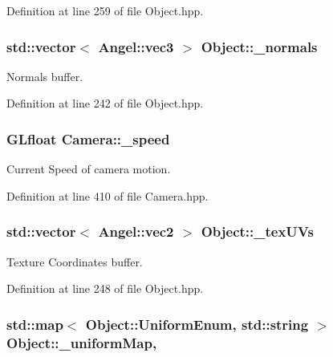 Definition at line 259 of file Object.\-hpp.

\hypertarget{class_object_a20bb786cb5915934853855aab9d1a1b3}{
\subsubsection[{\-\_\-normals}]{\setlength{\rightskip}{0pt plus 5cm}std\-::vector$<$ {\bf Angel\-::vec3} $>$ Object\-::\-\_\-normals\hspace{0.3cm}{\ttfamily [inherited]}}}\label{class_object_a20bb786cb5915934853855aab9d1a1b3}


Normals buffer. 



Definition at line 242 of file Object.\-hpp.

\hypertarget{class_camera_a21f8eb53e5369018e39add0453ae626d}{
\subsubsection[{\-\_\-speed}]{\setlength{\rightskip}{0pt plus 5cm}G\-Lfloat Camera\-::\-\_\-speed\hspace{0.3cm}{\ttfamily [private]}}}\label{class_camera_a21f8eb53e5369018e39add0453ae626d}


Current Speed of camera motion. 



Definition at line 410 of file Camera.\-hpp.

\hypertarget{class_object_aa9ddc3b95d74b76ab8a251fb376dfafb}{
\subsubsection[{\-\_\-tex\-U\-Vs}]{\setlength{\rightskip}{0pt plus 5cm}std\-::vector$<$ {\bf Angel\-::vec2} $>$ Object\-::\-\_\-tex\-U\-Vs\hspace{0.3cm}{\ttfamily [inherited]}}}\label{class_object_aa9ddc3b95d74b76ab8a251fb376dfafb}


Texture Coordinates buffer. 



Definition at line 248 of file Object.\-hpp.

\hypertarget{class_object_a6378d0b0eeec23045ae2a5245e42bf13}{
\subsubsection[{\-\_\-uniform\-Map}]{\setlength{\rightskip}{0pt plus 5cm}std\-::map$<$ {\bf Object\-::\-Uniform\-Enum}, std\-::string $>$ Object\-::\-\_\-uniform\-Map\hspace{0.3cm}{\ttfamily [protected]}, {\ttfamily [inherited]}}}\label{class_object_a6378d0b0eeec23045ae2a5245e42bf13}


